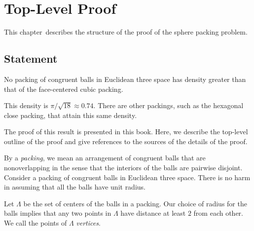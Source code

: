 



\label{part:form}
\chapter{Top-Level Proof}

\label{sec:overview}

This chapter\ describes the structure of the proof of the
 sphere packing problem.


\section{Statement}\label{sec:statement}


\begin{theorem}
\label{theorem:kepler}   No packing of congruent balls in
Euclidean three space has density greater than that of the
face-centered cubic packing.
\end{theorem}

\begin{remark}
This density is $\pi/\sqrt{18}\approx 0.74.$  There are other
packings, such as the hexagonal close packing, that attain this
same density.
\end{remark}

The proof of this result is presented in this book. Here, we
describe the top-level outline of the proof and give references to
the sources of the details of the proof.

By a {\it packing}, we mean an arrangement of congruent balls that
are nonoverlapping in the sense that the interiors of the balls are
pairwise disjoint. Consider a  packing of congruent
balls in Euclidean three space. There is no harm in assuming that
all the balls have unit radius. 

%

Let $\Lambda$ be the set of centers of the balls in a
packing. Our choice of radius for the
balls implies that any two points in $\Lambda$ have distance at
least $2$ from each other. We call the points of $\Lambda$ {\it
{} vertices}.

